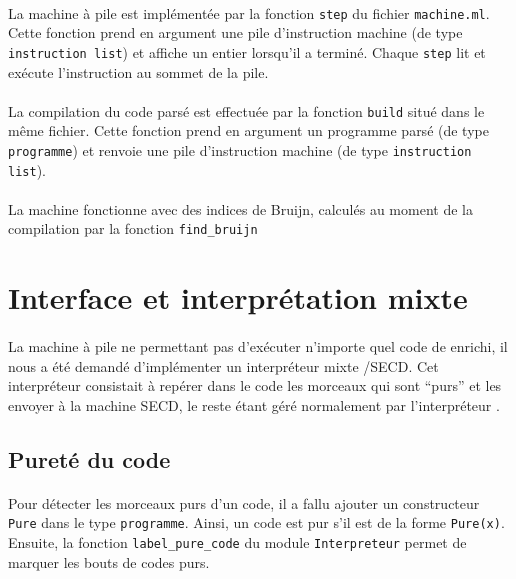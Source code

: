 \paragraph{} La machine à pile est implémentée par la fonction \texttt{step} du fichier \texttt{machine.ml}. Cette fonction prend en argument une pile d'instruction machine (de type \texttt{instruction list}) et affiche un entier lorsqu'il a terminé. Chaque \texttt{step} lit et exécute l'instruction au sommet de la pile.

\paragraph{} La compilation du code parsé est effectuée par la fonction \texttt{build} situé dans le même fichier. Cette fonction prend en argument un programme \fouine parsé (de type \texttt{programme}) et renvoie une pile d'instruction machine (de type \texttt{instruction list}).

\paragraph{} La machine fonctionne avec des indices de Bruijn, calculés au moment de la compilation par la fonction \texttt{find\_bruijn}


\section{Interface et interprétation mixte}

\paragraph{}La machine à pile ne permettant pas d'exécuter n'importe quel code de \fouine enrichi, il nous a été demandé d'implémenter un interpréteur mixte \fouine/SECD. Cet interpréteur consistait à repérer dans le code les morceaux qui sont ``purs'' et les envoyer à la machine SECD, le reste étant géré normalement par l'interpréteur \fouine.

\subsection{Pureté du code}
\paragraph{}Pour détecter les morceaux purs d'un code, il a fallu ajouter un constructeur \texttt{Pure} dans le type \texttt{programme}. Ainsi, un code est pur s'il est de la forme \texttt{Pure(x)}. \\
Ensuite, la fonction \texttt{label\_pure\_code} du module \texttt{Interpreteur} permet de marquer les bouts de codes purs.
